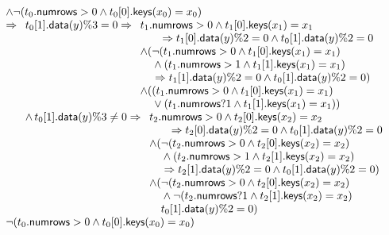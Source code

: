 \documentclass{article}
\newcommand{\NumRows}{\mathsf{numrows}}
\newcommand{\MatchRow}{\mathsf{keys}}
\newcommand{\ActionDataRow}{\mathsf{data}}
\begin{document}
\[\begin{array}{l}
  \wedge \neg (t_0.\NumRows > 0 \wedge t_0[0].\MatchRow(x_0) = x_0 ) \\
  \Rightarrow
  \begin{array}[t]{l}
    t_0[1].\ActionDataRow(y) \% 3 = 0 \Rightarrow
    \begin{array}[t]{l}
      t_1.\NumRows > 0 \wedge t_1[0].\MatchRow(x_1) = x_1 \\
      \qquad \Rightarrow t_1[0].\ActionDataRow(y) \% 2 = 0 \wedge t_0[1].\ActionDataRow(y)\% 2 = 0 \\
      \wedge (\neg (t_1.\NumRows > 0 \wedge t_1[0].\MatchRow(x_1) = x_1) \\
      \phantom{\wedge(}\wedge (t_1.\NumRows > 1 \wedge t_1[1].\MatchRow(x_1) = x_1) \\
      \phantom{\wedge(}\Rightarrow t_1[1].\ActionDataRow(y) \% 2 = 0 \wedge t_0[1].\ActionDataRow(y)\% 2 = 0 )\\
      \wedge ((t_1.\NumRows > 0 \wedge t_1[0].\MatchRow(x_1) = x_1) \\
      \phantom{\wedge (}\vee (t_1.\NumRows ? 1 \wedge t_1[1].\MatchRow(x_1) = x_1)) \\
    \end{array} \\
    \wedge\,t_0[1].\ActionDataRow(y) \% 3 \neq 0 \Rightarrow
    \begin{array}[t]{l}
      t_2.\NumRows > 0 \wedge t_2[0].\MatchRow(x_2) = x_2 \\
      \qquad \Rightarrow t_2[0].\ActionDataRow(y) \% 2 = 0 \wedge t_0[1].\ActionDataRow(y)\% 2 = 0 \\
      \wedge (\neg (t_2.\NumRows > 0 \wedge t_2[0].\MatchRow(x_2) = x_2) \\
      \phantom{\wedge(}\wedge (t_2.\NumRows > 1 \wedge t_2[1].\MatchRow(x_2) = x_2) \\
      \phantom{\wedge(}\Rightarrow t_2[1].\ActionDataRow(y) \% 2 = 0 \wedge t_0[1].\ActionDataRow(y)\% 2 = 0 )\\
      \wedge (\neg (t_2.\NumRows > 0 \wedge t_2[0].\MatchRow(x_2) = x_2) \\
      \phantom{\wedge (}\wedge \neg (t_2.\NumRows ? 1 \wedge t_2[1].\MatchRow(x_2) = x_2) \\
      \phantom{\wedge (} t_0[1].\ActionDataRow(y) \% 2 = 0)
    \end{array}
  \end{array} \\
  \neg (t_0.\NumRows > 0 \wedge t_0[0].\MatchRow(x_0) = x_0) \\

\end{array}\]
\end{document}
